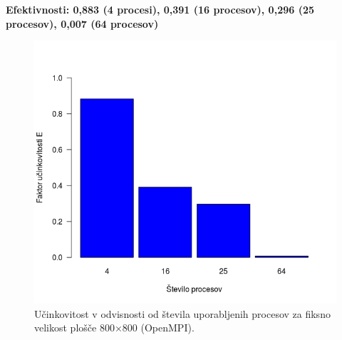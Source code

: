 \documentclass[a4paper,titlepage,11pt]{article}
\begin{document}
\textbf{Efektivnosti: 0,883 (4 procesi), 0,391 (16 procesov), 0,296 (25 procesov), 0,007 (64 procesov)}
\begin{figure}[H]
\begin{center}
\includegraphics[scale=0.6]{graf-rezultati-5_3.png}
\caption{Učinkovitost v odvisnosti od števila uporabljenih procesov za fiksno velikost plošče 800$\times$800 (OpenMPI).}
\label{graf-rezultati-ucinkovitost-5}
\end{center}
\vspace{-25pt}
\end{figure}
\end{document}
